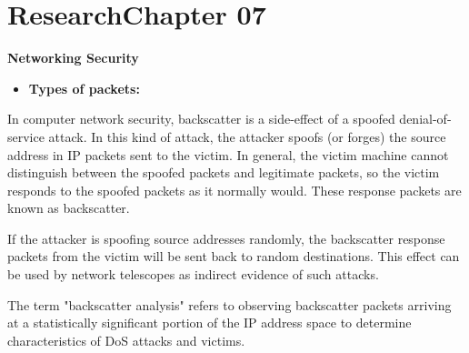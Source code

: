 \documentclass[../CIT288SecurityResearchNotebook.tex]{subfiles}
\begin{document}

\chapter[Research Ch. 07]{Research\linebreak[1] Chapter 07 \hspace*{\fill}{\date}}
\noindent\textbf{{Networking Security} }                             


\begin{itemize}
	\item{\bf{Types of packets:}} 
\end{itemize}



In computer network security, backscatter is a side-effect of a 
spoofed denial-of-service attack. In this kind of attack, the attacker 
spoofs (or forges) the source address in IP packets sent to the victim. 
In general, the victim machine cannot distinguish between the spoofed 
packets and legitimate packets, so the victim responds to the spoofed 
packets as it normally would. These response packets are known as backscatter.


If the attacker is spoofing source addresses randomly, the backscatter 
response packets from the victim will be sent back to random destinations. 
This effect can be used by network telescopes as indirect evidence of 
such attacks.


The term "backscatter analysis" refers to observing backscatter 
packets arriving at a statistically significant portion of the IP address 
space to determine characteristics of DoS attacks and victims.

\end{document}
